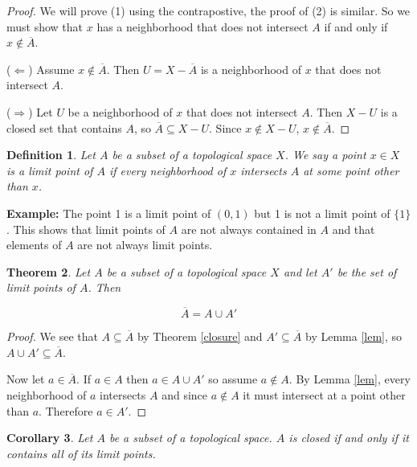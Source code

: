 \documentclass[a4paper]{article}
\newtheorem{theorem}{Theorem}
\newtheorem{definition}[theorem]{Definition}
\newtheorem{corollary}[theorem]{Corollary}
\numberwithin{theorem}{section}
\begin{document}
\begin{proof}
We will prove (1) using the contrapostive, the proof of (2) is similar. So we must show that $x$ has a neighborhood that does not intersect $A$ if and only if $x \not \in \overline{A}$.

($\Leftarrow$) Assume $x \not \in \overline{A}$. Then $U = X - \overline{A}$ is a neighborhood of $x$ that does not intersect $A$.

($\Rightarrow$) Let $U$ be a neighborhood of $x$ that does not intersect $A$. Then $X - U$ is a closed set that contains $A$, so $\overline{A} \subseteq X-U$. Since $x \not \in X -U$, $x \not \in \overline{A}$.

\end{proof}

\begin{definition}
Let $A$ be a subset of a topological space $X$. We say a point $x \in X$ is a limit point of $A$ if every neighborhood of $x$ intersects $A$ at some point \textit{other than} $x$.

\end{definition}

\textbf{Example:} The point 1 is a limit point of $(0,1)$ but 1 is not a limit point of $\{1\}$. This shows that limit points of $A$ are not always contained in $A$ and that elements of $A$ are not always limit points.

\begin{theorem} \label{limpts}
Let $A$ be a subset of a topological space $X$ and let $A'$ be the set of limit points of $A$. Then

$$ \overline{A} = A \cup A' $$
\end{theorem}

\begin{proof}
We see that $A \subseteq \overline{A}$ by Theorem \ref{closure} and $A' \subseteq \overline{A}$ by Lemma \ref{lem}, so $A \cup A' \subseteq \overline{A}$.

Now let $a \in \overline{A}$. If $a \in A$ then $a \in A \cup A'$ so assume $a \not \in A$. By Lemma \ref{lem}, every neighborhood of $a$ intersects $A$ and since $a \not \in A$ it must intersect at a point other than $a$. Therefore $a \in A'$.

\end{proof}

\begin{corollary}
Let $A$ be a subset of a topological space. $A$ is closed if and only if it contains all of its limit points.
\end{corollary}
\end{document}
